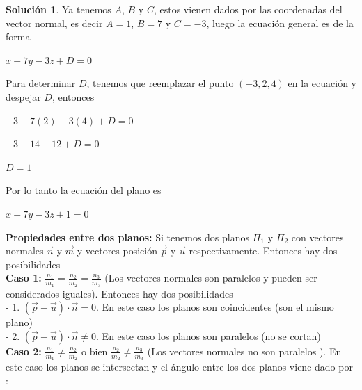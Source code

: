 \documentclass{article}
\theoremstyle{plain}
\theoremstyle{definition}
\newtheorem{sol}[thm]{Solución}
\begin{document}
\begin{sol}Ya tenemos $A$, $B$ y $C$, estos vienen dados por las coordenadas del vector normal, es decir $A=1$, $B=7$ y $C=-3$, luego la ecuación general es de la forma
\end{sol}

\begin{center}
$x+7y-3z+D=0$
\end{center}

Para determinar $D$, tenemos que reemplazar el punto $(-3,2,4)$ en la ecuación y despejar $D$, entonces


\begin{center}
$-3+7(2)-3(4)+D=0$
\end{center}

\begin{center}
$-3+14-12+D=0$
\end{center}

\begin{center}
$D=1$
\end{center}

Por lo tanto la ecuación del plano es


\begin{center}
$x+7y-3z+1=0$
\end{center}



\textbf{Propiedades entre dos planos:} Si tenemos dos planos $\Pi_1$  y  $\Pi_2$ con vectores normales $\overrightarrow{n}$ y $\overrightarrow{m}$ y vectores posición $\overrightarrow{p}$ y $\overrightarrow{u}$ respectivamente. Entonces hay dos posibilidades  \\

\textbf{Caso 1: }  $\displaystyle \frac{n_1}{m_1}= \frac{n_2}{m_2} = \frac{n_3}{m_3}$ (Los vectores normales son paralelos y pueden ser considerados iguales). Entonces hay dos posibilidades \\

- 1. $(\overrightarrow{p}-\overrightarrow{u}) \cdot \overrightarrow{n} =0$. En este caso los planos son coincidentes (son el mismo plano) \\

- 2. $(\overrightarrow{p}-\overrightarrow{u}) \cdot \overrightarrow{n} \neq 0$. En este caso los planos son paralelos (no se cortan) \\





\textbf{Caso 2: }  $\displaystyle \frac{n_1}{m_1} \neq \frac{n_2}{m_2}$ o bien $\displaystyle \frac{n_2}{m_2} \neq \frac{n_3}{m_3}$ (Los vectores normales  no son paralelos ). En este caso los planos se intersectan y el ángulo entre los dos planos viene dado por : \\
\end{document}
